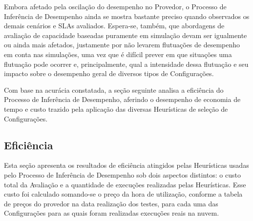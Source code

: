 Embora afetado pela oscilação do desempenho no Provedor, o Processo de Inferência
de Desempenho ainda se mostra bastante preciso quando observados os demais 
cenários e SLAs avaliados. Espera-se, também, que abordagens de avaliação de
capacidade baseadas puramente em simulação devam ser igualmente ou ainda mais 
afetados, justamente por não levarem flutuações de desempenho em conta nas 
simulações, uma vez que é difícil prever em que situações uma flutuação pode 
ocorrer e, principalmente, qual a intensidade dessa flutuação e seu impacto sobre 
o desempenho geral de diversos tipos de Configurações.   

Com base na acurácia constatada, a seção seguinte analisa a eficiência do Processo
de Inferência de Desempenho, aferindo o desempenho de economia de tempo e custo
trazido pela aplicação das diversas Heurísticas de seleção de Configurações. 

\subsection{Eficiência}
\label{subsec:resultados_eficiencia}
Esta seção apresenta os resultados de eficiência atingidos pelas Heurísticas usadas 
pelo Processo de Inferência de Desempenho sob dois aspectos distintos: o custo 
total da Avaliação e a quantidade de execuções realizadas pelas Heurísticas. Esse 
custo foi calculado somando-se o preço da hora de utilização, conforme a tabela 
de preços do provedor na data realização dos testes, para cada uma das Configurações 
para as quais foram realizadas execuções reais na nuvem. 

